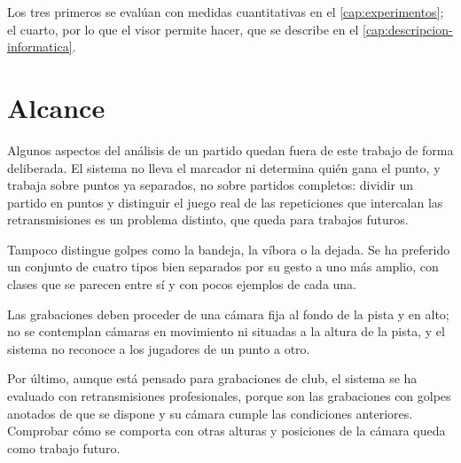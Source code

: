 Los tres primeros se evalúan con medidas cuantitativas en el \cref{cap:experimentos}; el cuarto, por lo que el visor permite hacer, que se describe en el \cref{cap:descripcion-informatica}.

\section{Alcance}
\label{sec:alcance}

Algunos aspectos del análisis de un partido quedan fuera de este trabajo de forma deliberada.
El sistema no lleva el marcador ni determina quién gana el punto, y trabaja sobre puntos ya separados, no sobre partidos completos: dividir un partido en puntos y distinguir el juego real de las repeticiones que intercalan las retransmisiones es un problema distinto, que queda para trabajos futuros.

Tampoco distingue golpes como la bandeja, la víbora o la dejada.
Se ha preferido un conjunto de cuatro tipos bien separados por su gesto a uno más amplio, con clases que se parecen entre sí y con pocos ejemplos de cada una.

Las grabaciones deben proceder de una cámara fija al fondo de la pista y en alto; no se contemplan cámaras en movimiento ni situadas a la altura de la pista, y el sistema no reconoce a los jugadores de un punto a otro.

Por último, aunque está pensado para grabaciones de club, el sistema se ha evaluado con retransmisiones profesionales, porque son las grabaciones con golpes anotados de que se dispone y su cámara cumple las condiciones anteriores.
Comprobar cómo se comporta con otras alturas y posiciones de la cámara queda como trabajo futuro.
